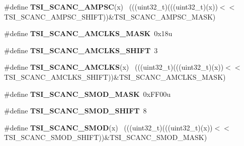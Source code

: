 \begin{DoxyCompactItemize}
\item 
\hypertarget{group___t_s_i___register___masks_ga4b0c2e21de678ed097431bb897d4f73f}{}\#define {\bfseries T\+S\+I\+\_\+\+S\+C\+A\+N\+C\+\_\+\+A\+M\+P\+S\+C}(x)                                          ~(((uint32\+\_\+t)(((uint32\+\_\+t)(x))$<$$<$T\+S\+I\+\_\+\+S\+C\+A\+N\+C\+\_\+\+A\+M\+P\+S\+C\+\_\+\+S\+H\+I\+F\+T))\&T\+S\+I\+\_\+\+S\+C\+A\+N\+C\+\_\+\+A\+M\+P\+S\+C\+\_\+\+M\+A\+S\+K)\label{group___t_s_i___register___masks_ga4b0c2e21de678ed097431bb897d4f73f}

\item 
\hypertarget{group___t_s_i___register___masks_ga020a126e5eafeff150a1b960bc17679f}{}\#define {\bfseries T\+S\+I\+\_\+\+S\+C\+A\+N\+C\+\_\+\+A\+M\+C\+L\+K\+S\+\_\+\+M\+A\+S\+K}~0x18u\label{group___t_s_i___register___masks_ga020a126e5eafeff150a1b960bc17679f}

\item 
\hypertarget{group___t_s_i___register___masks_ga4800a19f7603462d1b6ba211b9cb8b5f}{}\#define {\bfseries T\+S\+I\+\_\+\+S\+C\+A\+N\+C\+\_\+\+A\+M\+C\+L\+K\+S\+\_\+\+S\+H\+I\+F\+T}~3\label{group___t_s_i___register___masks_ga4800a19f7603462d1b6ba211b9cb8b5f}

\item 
\hypertarget{group___t_s_i___register___masks_ga3cf9761f62c8570d4d82d8752df90e96}{}\#define {\bfseries T\+S\+I\+\_\+\+S\+C\+A\+N\+C\+\_\+\+A\+M\+C\+L\+K\+S}(x)                                        ~(((uint32\+\_\+t)(((uint32\+\_\+t)(x))$<$$<$T\+S\+I\+\_\+\+S\+C\+A\+N\+C\+\_\+\+A\+M\+C\+L\+K\+S\+\_\+\+S\+H\+I\+F\+T))\&T\+S\+I\+\_\+\+S\+C\+A\+N\+C\+\_\+\+A\+M\+C\+L\+K\+S\+\_\+\+M\+A\+S\+K)\label{group___t_s_i___register___masks_ga3cf9761f62c8570d4d82d8752df90e96}

\item 
\hypertarget{group___t_s_i___register___masks_gabe47ab9c65156f2c6cb9389b96c36843}{}\#define {\bfseries T\+S\+I\+\_\+\+S\+C\+A\+N\+C\+\_\+\+S\+M\+O\+D\+\_\+\+M\+A\+S\+K}~0x\+F\+F00u\label{group___t_s_i___register___masks_gabe47ab9c65156f2c6cb9389b96c36843}

\item 
\hypertarget{group___t_s_i___register___masks_gaea5084730b6e76063397e67f558ab423}{}\#define {\bfseries T\+S\+I\+\_\+\+S\+C\+A\+N\+C\+\_\+\+S\+M\+O\+D\+\_\+\+S\+H\+I\+F\+T}~8\label{group___t_s_i___register___masks_gaea5084730b6e76063397e67f558ab423}

\item 
\hypertarget{group___t_s_i___register___masks_gac2872c89d4a12afb8e253c30657386f2}{}\#define {\bfseries T\+S\+I\+\_\+\+S\+C\+A\+N\+C\+\_\+\+S\+M\+O\+D}(x)                                            ~(((uint32\+\_\+t)(((uint32\+\_\+t)(x))$<$$<$T\+S\+I\+\_\+\+S\+C\+A\+N\+C\+\_\+\+S\+M\+O\+D\+\_\+\+S\+H\+I\+F\+T))\&T\+S\+I\+\_\+\+S\+C\+A\+N\+C\+\_\+\+S\+M\+O\+D\+\_\+\+M\+A\+S\+K)\label{group___t_s_i___register___masks_gac2872c89d4a12afb8e253c30657386f2}


\end{DoxyCompactItemize}
